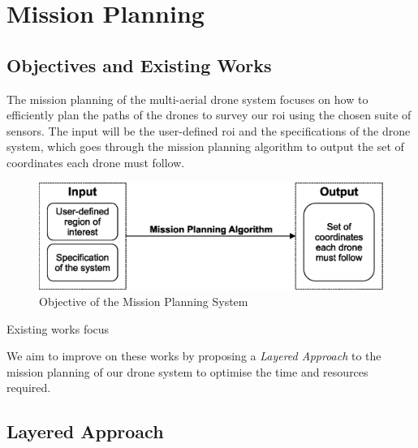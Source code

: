 \newpage
{}
\section{Mission Planning} \label{missionplanning}

\subsection{Objectives and Existing Works}

The mission planning of the multi-aerial drone system focuses on how to efficiently plan the paths of the drones to survey our \gls{roi} using the chosen suite of sensors. The input will be the user-defined \gls{roi} and the specifications of the drone system, which goes through the mission planning algorithm to output the set of coordinates each drone must follow.

\begin{figure}
    \centering
    \includegraphics[width=0.5\linewidth]{figs/Objective of the Mission Planning System.eps}
    \caption{Objective of the Mission Planning System}
    \label{fig:objmsp}
\end{figure}

Existing works focus 

We aim to improve on these works by proposing a \textit{Layered Approach} to the mission planning of our drone system to optimise the time and resources required.  

\subsection{Layered Approach}

